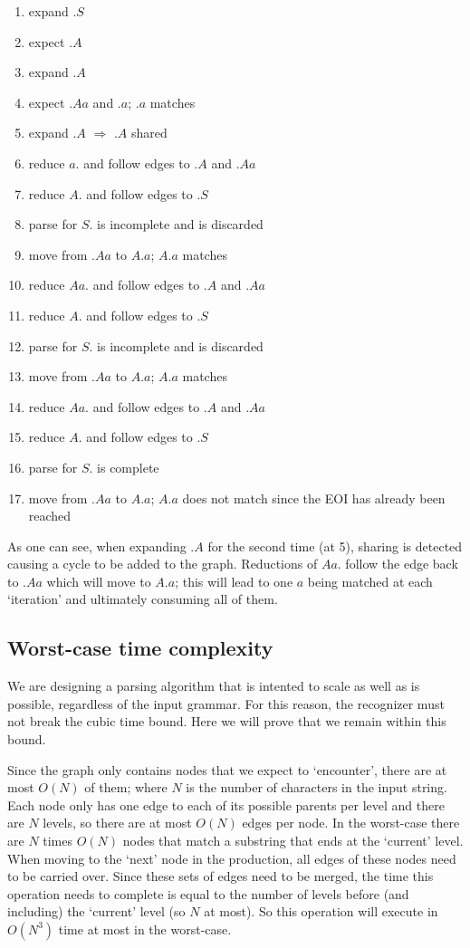 \documentclass[a4paper,10pt]{article}
\begin{document}
\begin{enumerate}
 \setlength{\itemsep}{0pt}
 \setlength{\parskip}{0pt}
 \setlength{\parsep}{0pt}
 
 \item expand $.S$
 \item expect $.A$
 \item expand $.A$
 \item expect $.Aa$ and $.a$; $.a$ matches
 \item expand $.A$ $\Rightarrow$ $.A$ shared
 \item reduce $a.$ and follow edges to $.A$ and $.Aa$
 \item reduce $A.$ and follow edges to $.S$
 \item parse for $S.$ is incomplete and is discarded
 \item move from $.Aa$ to $A.a$; $A.a$ matches
 \item reduce $Aa.$ and follow edges to $.A$ and $.Aa$
 \item reduce $A.$ and follow edges to $.S$
 \item parse for $S.$ is incomplete and is discarded
 \item move from $.Aa$ to $A.a$; $A.a$ matches
 \item reduce $Aa.$ and follow edges to $.A$ and $.Aa$
 \item reduce $A.$ and follow edges to $.S$
 \item parse for $S.$ is complete
 \item move from $.Aa$ to $A.a$; $A.a$ does not match since the EOI has already been reached
\end{enumerate}
As one can see, when expanding $.A$ for the second time (at 5), sharing is detected causing a cycle to be added to the graph. Reductions of $Aa.$ follow the edge back to $.Aa$ which will move to $A.a$; this will lead to one $a$ being matched at each `iteration' and ultimately consuming all of them.

\subsection{Worst-case time complexity}
\label{subsec:recognizerComplexity}

We are designing a parsing algorithm that is intented to scale as well as is possible, regardless of the input grammar. For this reason, the recognizer must not break the cubic time bound. Here we will prove that we remain within this bound.

Since the graph only contains nodes that we expect to `encounter', there are at most $O(N)$ of them; where $N$ is the number of characters in the input string. Each node only has one edge to each of its possible parents per level and there are $N$ levels, so there are at most $O(N)$ edges per node. In the worst-case there are $N$ times $O(N)$ nodes that match a substring that ends at the `current' level. When moving to the `next' node in the production, all edges of these nodes need to be carried over. Since these sets of edges need to be merged, the time this operation needs to complete is equal to the number of levels before (and including) the `current' level (so $N$ at most). So this operation will execute in $O(N^3)$ time at most in the worst-case.
\end{document}

